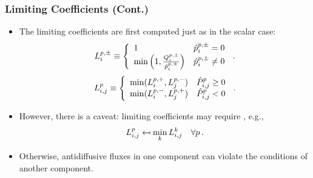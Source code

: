\begin{frame}
\frametitle{Limiting Coefficients (Cont.)}

\begin{itemize}
  \item The limiting coefficients are first computed just as in the scalar case:
    \begin{equation}
      L_i^{p,\pm} \equiv\left\{
        \begin{array}{l l}
          1 & \hat{p}_i^{p,\pm} = 0\\
          \min\left(1,\frac{Q_i^{p,\pm}}
            {\hat{p}_i^{p,\pm}}\right) &
          \hat{p}_i^{p,\pm} \ne 0
        \end{array}
      \right. \,.
    \end{equation}
    \begin{equation}
      \limiterletter\ij^\componentindex \equiv\left\{
        \begin{array}{l l}
          \min(L_i^{\componentindex,+},L_j^{\componentindex,-}) &
            \hat{\correctionfluxentry}\ij^\componentindex \geq 0\\
          \min(L_i^{\componentindex,-},L_j^{\componentindex,+}) &
            \hat{\correctionfluxentry}\ij^\componentindex < 0
        \end{array}
      \right. \eqp
    \end{equation}
  \item However, there is a caveat: limiting coefficients may require
    , e.g.,
    \begin{equation}
      L_{i,j}^p \mapsfrom
        \min\limits_kL_{i,j}^k \quad \forall p \,.
    \end{equation}
  \item Otherwise, antidiffusive fluxes in one component can violate the
    conditions of another component.
\end{itemize}

\end{frame}
